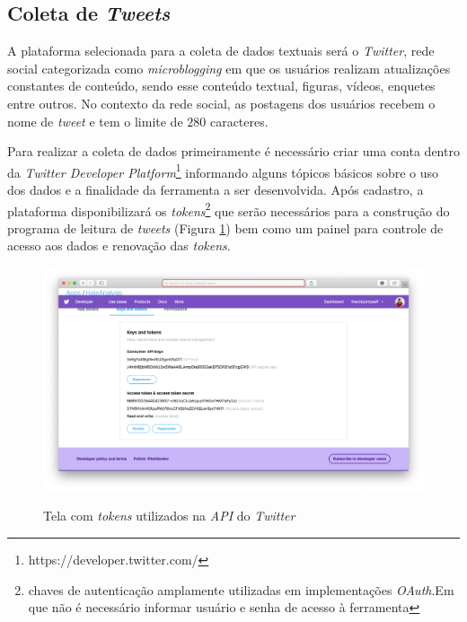 \subsection{Coleta de \textit{Tweets}}
\label{subsec:coletatweets}
A plataforma selecionada para a coleta de dados textuais será o \textit{Twitter}, rede social categorizada como \textit{microblogging} em que os usuários realizam atualizações constantes de conteúdo, sendo esse conteúdo textual, figuras, vídeos, enquetes entre outros. No contexto da rede social, as postagens dos usuários recebem o nome de \textit{tweet} e tem o limite de $280$ caracteres. 

Para realizar a coleta de dados primeiramente é necessário criar uma conta dentro da \textit{Twitter Developer Platform}\footnote{https://developer.twitter.com/} informando alguns tópicos básicos sobre o uso dos dados e a finalidade da ferramenta a ser desenvolvida. Após cadastro, a plataforma disponibilizará os \textit{tokens}\footnote{chaves de autenticação amplamente utilizadas em implementações \textit{OAuth}.Em que não é necessário informar usuário e senha de acesso à ferramenta} que serão necessários para a construção do programa de leitura de \textit{tweets} (Figura \ref{fig:twitterdeveloperplatform}) bem como um painel para controle de acesso aos dados e renovação das \textit{tokens}.

\begin{figure}[!h]
\centering 
\caption{Tela com \textit{tokens} utilizados na \textit{API} do \textit{Twitter}}
\includegraphics[scale=0.3]{imagens/twitterdeveloperplatform.png}
\label{fig:twitterdeveloperplatform}
\end{figure}

